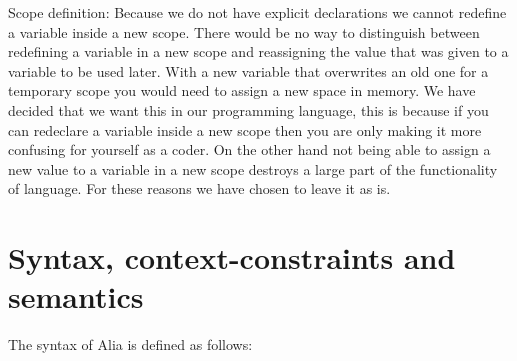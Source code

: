 \documentclass[paper=a4, fontsize=11pt]{article}
\numberwithin{equation}{section}		%
\numberwithin{figure}{section}			%
\numberwithin{table}{section}				%
\begin{document}
Scope definition: Because we do not have explicit declarations we cannot redefine a variable inside a new scope. There would be no way to distinguish between redefining a variable in a new scope and reassigning the value that was given to a variable to be used later. With a new variable that overwrites an old one for a temporary scope you would need to assign a new space in memory. We have decided that we want this in our programming language, this is because if you can redeclare a variable inside a new scope then you are only making it more confusing for yourself as a coder. On the other hand not being able to assign a new value to a variable in a new scope destroys a large part of the functionality of language. For these reasons we have chosen to leave it as is.




\section{Syntax, context-constraints and semantics}
The syntax of Alia is defined as follows:
\end{document}
